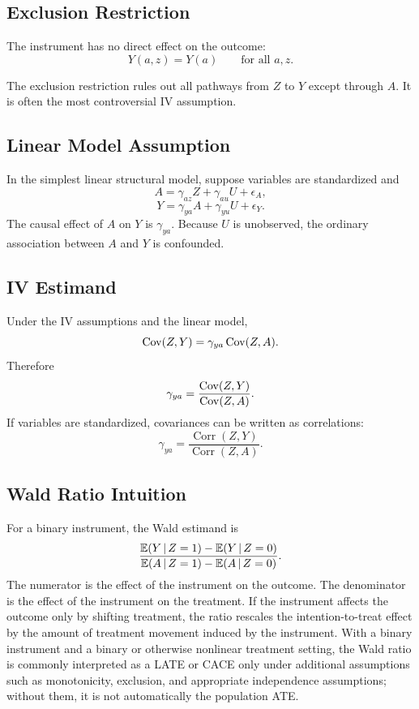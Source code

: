 \subsection{Exclusion Restriction}

\begin{assumptionbox}
The instrument has no direct effect on the outcome:
\[
  Y(a,z)=Y(a)
  \qquad\text{for all }a,z.
\]
\end{assumptionbox}

The exclusion restriction rules out all pathways from $Z$ to $Y$ except through
$A$. It is often the most controversial IV assumption.

\subsection{Linear Model Assumption}

In the simplest linear structural model, suppose variables are standardized and
\[
  A=\gamma_{az}Z+\gamma_{au}U+\epsilon_A,
\]
\[
  Y=\gamma_{ya}A+\gamma_{yu}U+\epsilon_Y.
\]
The causal effect of $A$ on $Y$ is $\gamma_{ya}$. Because $U$ is unobserved,
the ordinary association between $A$ and $Y$ is confounded.

\subsection{IV Estimand}

Under the IV assumptions and the linear model,
\[
  \operatorname{Cov}(Z,Y)=\gamma_{ya}\operatorname{Cov}(Z,A).
\]
Therefore
\[
  \gamma_{ya}=\frac{\operatorname{Cov}(Z,Y)}{\operatorname{Cov}(Z,A)}.
\]
If variables are standardized, covariances can be written as correlations:
\[
  \gamma_{ya}=\frac{\operatorname{Corr}(Z,Y)}
  {\operatorname{Corr}(Z,A)}.
\]

\subsection{Wald Ratio Intuition}

For a binary instrument, the Wald estimand is
\[
  \frac{\mathbb{E}(Y\,\vert\, Z=1)-\mathbb{E}(Y\,\vert\, Z=0)}
       {\mathbb{E}(A\,\vert\, Z=1)-\mathbb{E}(A\,\vert\, Z=0)}.
\]
The numerator is the effect of the instrument on the outcome. The denominator is
the effect of the instrument on the treatment. If the instrument affects the
outcome only by shifting treatment, the ratio rescales the intention-to-treat
effect by the amount of treatment movement induced by the instrument.
With a binary instrument and a binary or otherwise nonlinear treatment setting,
the Wald ratio is commonly interpreted as a LATE or CACE only under additional
assumptions such as monotonicity, exclusion, and appropriate independence
assumptions; without them, it is not automatically the population ATE.

